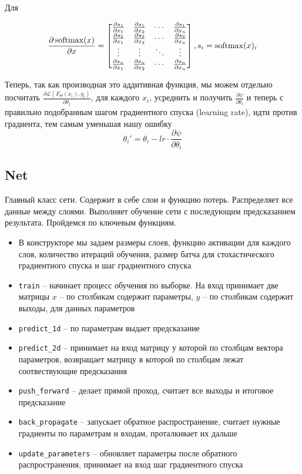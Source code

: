 \documentclass{article}
\begin{document}
Для

$$
\frac{\partial \operatorname{softmax}(x)}{\partial x} =
\begin{bmatrix}{}
    \frac{\partial s_{1}}{\partial x_{1}} & \frac{\partial s_{1}}{\partial x_{2}} & \cdots & \frac{\partial s_{1}}{\partial x_{n}} \\
    \frac{\partial s_{2}}{\partial x_{1}} & \frac{\partial s_{2}}{\partial x_{2}} & \cdots & \frac{\partial s_{2}}{\partial x_{n}} \\
    \vdots & \vdots & \ddots & \vdots \\
    \frac{\partial s_{n}}{\partial x_{1}} & \frac{\partial s_{n}}{\partial x_{2}} & \cdots & \frac{\partial s_{n}}{\partial x_{n}}
\end{bmatrix},
s_i = \operatorname{softmax}(x)_i
$$

Теперь, так как производная это аддитивная функция, мы можем отдельно посчитать $\frac{\partial \mathscr{L}(F_\Theta(x_i), y_i)}{\partial \theta_j}$, для каждого $x_i$, усреднить и получить $\frac{\partial \psi}{\partial \theta_i}$ и теперь с правильно подобранным шагом градиентного спуска (learning rate), идти против градиента, тем самым уменьшая нашу ошибку
$$
\theta_i' = \theta_i - lr \cdot \frac{\partial \psi}{\partial \theta_i}
$$

\subsection{Net}
Главный класс сети. Содержит в себе слои и функцию потерь. Распределяет все данные между слоями. Выполняет обучение сети с последующим предсказанием результата. Пройдемся по ключевым функциям.

\begin{itemize}
    \item В конструкторе мы задаем размеры слоев, функцию активации для каждого слоя, количество итераций обучения, размер батча для стохастического градиентного спуска и шаг градиентного спуска
    \item \texttt{train} -- начинает процесс обучения по выборке. На вход принимает две матрицы $x$ -- по столбикам содержит параметры, $y$ -- по столбикам содержит выходы, для данных параметров
    \item \texttt{predict\_1d} -- по параметрам выдает предсказание
    \item \texttt{predict\_2d} -- принимает на вход матрицу у которой по столбцам вектора параметров, возвращает матрицу в которой по столбцам лежат соотвествующие предсказания
    \item \texttt{push\_forward} -- делает прямой проход, считает все выходы и итоговое предсказание
    \item \texttt{back\_propagate} -- запускает обратное распространение, считает нужные градиенты по параметрам и входам, проталкивает их дальше
    \item \texttt{update\_parameters} -- обновляет параметры после обратного распространения, принимает на вход шаг градиентного спуска
\end{itemize}
\end{document}
